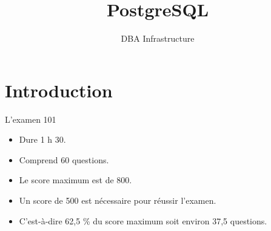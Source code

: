 \documentclass[aspectratio=169]{beamer}
\title{PostgreSQL}
\subtitle{DBA Infrastructure}
\begin{document}

\begin{frame}


\titlepage

\end{frame}


\section*{Introduction}








\begin{frame}{L'examen 101}

\begin{itemize}

\item Dure 1 h 30.

\item Comprend 60 questions.

\item Le score maximum est de 800.

\item Un score de 500 est nécessaire pour réussir l'examen.

\item C'est-à-dire 62,5 \% du score maximum soit environ 37,5 questions.

\end{itemize}

\begin{toile}
\end{toile}

\end{frame}

\end{document}
